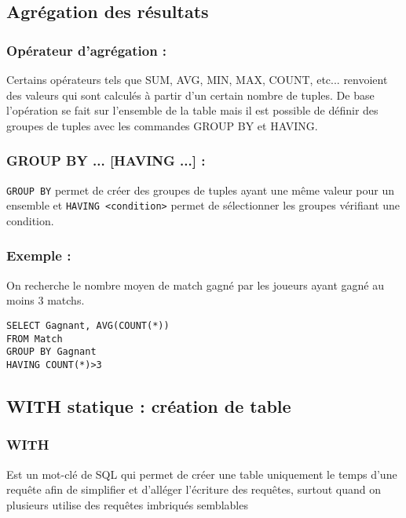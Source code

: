 \documentclass[10pt,a4paper,twoside]{article}
\begin{document}
\subsection{Agrégation des résultats}
\subsubsection{Opérateur d'agrégation :} Certains opérateurs tels que SUM, AVG, MIN, MAX, COUNT, etc... renvoient des valeurs qui sont calculés à partir d'un certain nombre de tuples. De base l'opération se fait sur l'ensemble de la table mais il est possible de définir des groupes de tuples avec les commandes GROUP BY et HAVING.

\subsubsection{GROUP BY ... [HAVING ...] :} \verb=GROUP BY= permet de créer des groupes de tuples ayant une même valeur pour un ensemble et \verb=HAVING <condition>= permet de sélectionner les groupes vérifiant une condition.

\subsubsection{Exemple :} On recherche le nombre moyen de match gagné par les joueurs ayant gagné au moins 3 matchs.
\begin{verbatim}
SELECT Gagnant, AVG(COUNT(*))
FROM Match
GROUP BY Gagnant
HAVING COUNT(*)>3
\end{verbatim}

\subsection{WITH statique : création de table}
\subsubsection{WITH} 
Est un mot-clé de SQL qui permet de créer une table uniquement le temps d'une requête afin de simplifier  et d'alléger l'écriture des requêtes, surtout quand on plusieurs utilise des requêtes imbriqués semblables
\end{document}

